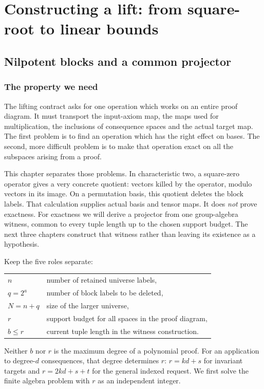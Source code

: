 \documentclass[11pt,a4paper,oneside,openany]{book}
\theoremstyle{definition}\newtheorem{definition}[theorem]{Definition}
\theoremstyle{remark}\newtheorem{remark}[theorem]{Remark}
\numberwithin{equation}{chapter}
\begin{document}
\part{Constructing a lift: from square-root to linear bounds}

\chapter{Nilpotent blocks and a common projector}\label{tx:sec:block-algebra}
\label{tx:ch:square-zero}
\section*{The property we need}
The lifting contract asks for one operation which works on an entire
proof diagram. It must transport the input-axiom map, the maps used for
multiplication, the inclusions of consequence spaces and the actual
target map. The first problem is to find an operation which has the
right effect on bases. The second, more difficult problem is to make
that operation exact on all the subspaces arising from a proof.

This chapter separates those problems. In characteristic two, a
square-zero operator gives a very concrete quotient: vectors killed
by the operator, modulo vectors in its image. On a permutation basis,
this quotient deletes the block labels. That calculation supplies
actual basis and tensor maps. It does \emph{not} prove exactness.
For exactness we will derive a projector from one group-algebra
witness, common to every tuple length up to the chosen support budget.
The next three chapters construct that witness rather than leaving
its existence as a hypothesis.

Keep the five roles separate:
\begin{center}
\begin{tabular}{@{}ll@{}}
$n$ & number of retained universe labels,\\
$q=2^a$ & number of block labels to be deleted,\\
$N=n+q$ & size of the larger universe,\\
$r$ & support budget for all spaces in the proof diagram,\\
$b\le r$ & current tuple length in the witness construction.
\end{tabular}
\end{center}
Neither $b$ nor $r$ is the maximum degree of a polynomial proof.
For an application to degree-$d$ consequences, that degree determines
$r$: $r=kd+s$ for invariant targets and $r=2kd+s+t$ for the general
indexed request. We first solve the finite algebra problem with $r$
as an independent integer.
\end{document}
